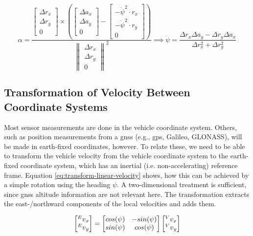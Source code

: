 \begin{equation}\label{eq:angacc-from-linacc-2d}%
\alpha%
= \frac{\begin{bmatrix}\Delta r_x \\ \Delta r_y \\ 0\end{bmatrix} \times \left(\begin{bmatrix}\Delta a_x \\ \Delta a_y \\ 0\end{bmatrix} - \begin{bmatrix}-\dot{\psi}^2 \cdot r_x \\ -\dot{\psi}^2 \cdot r_y \\ 0\end{bmatrix}\right)}{\begin{Vmatrix}\Delta r_x \\ \Delta r_y \\ 0\end{Vmatrix}^2}%
\implies \ddot{\psi} = \frac{\Delta r_x\Delta a_y - \Delta r_y\Delta a_x}{\Delta r_x^2 + \Delta r_y^2}%
\end{equation}


\subsection{Transformation of Velocity Between Coordinate Systems}
Most sensor measurements are done in the vehicle coordinate system. Others, such as position measurements from a \gls{gnss} (e.g., \gls{gps}, Galileo, GLONASS), will be made in earth-fixed coordinates, however. To relate these, we need to be able to transform the vehicle velocity from the vehicle coordinate system to the earth-fixed coordinate system, which has an inertial (i.e. non-accelerating) reference frame. Equation \ref{eq:transform-linear-velocity} shows, how this can be achieved by a simple rotation using the heading $\psi$. A two-dimensional treatment is sufficient, since \gls{gnss} altitude information are not relevant here. The transformation extracts the east-/northward components of the local velocities and adds them.

\begin{equation}\label{eq:transform-linear-velocity}%
\begin{bmatrix}\prescript{E}{}{v}_x \\ \prescript{E}{}{v}_y\end{bmatrix}%
=\begin{bmatrix}cos(\psi) & -sin(\psi) \\ sin(\psi) & cos(\psi)\end{bmatrix}%
\begin{bmatrix}\prescript{V}{}{v}_x \\ \prescript{V}{}{v}_y\end{bmatrix}%
\end{equation}


